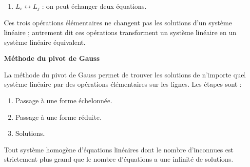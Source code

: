 \documentclass[10pt,class=article,crop=false]{standalone}
\begin{document}
\begin{multicols}{2}
\begin{enumerate}
	\item $L_i \leftrightarrow L_j$ : on peut échanger deux équations.
\end{enumerate}

Ces trois opérations élémentaires ne changent pas les solutions d'un système linéaire ;
autrement dit ces opérations transforment un système linéaire en un système linéaire équivalent.


\textbf{Méthode du pivot de Gauss}

La méthode du pivot de Gauss permet de trouver les solutions de n'importe
quel système linéaire par des opérations élémentaires sur les lignes. Les étapes sont :
\begin{enumerate}
	\item Passage à une forme échelonnée.
	\item Passage à une forme réduite.
    \item Solutions.
\end{enumerate}



\begin{theoreme}
	Tout système homogène d'équations linéaires dont le nombre d'inconnues est
	strictement plus grand que le nombre d'équations a une infinité de solutions.
\end{theoreme}



\end{multicols}
\end{document}
